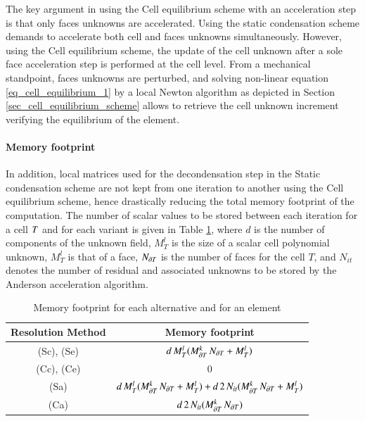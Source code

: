 The key argument in using the
Cell equilibrium scheme with an acceleration step is that 
only faces unknowns are accelerated.
Using the static condensation scheme demands to accelerate both cell and faces unknowns simultaneously.
However, using the Cell equilibrium scheme, the update of the cell unknown after a sole face acceleration step is performed at the cell level.
From a mechanical standpoint, faces unknowns are perturbed, and solving non-linear equation \eqref{eq_cell_equilibrium_1} by a local Newton algorithm as depicted in Section \ref{sec_cell_equilibrium_scheme} allows to retrieve the cell unknown increment verifying the equilibrium of the element.

\paragraph{Memory footprint}

In addition, local matrices used for the decondensation step in the Static condensation scheme are not kept from one iteration
to another using the Cell equilibrium scheme, hence drastically reducing the total memory footprint of the computation.
The number of scalar values to be stored between each iteration for a cell $T$ and for each variant is given in Table \ref{table_memory_footprint}, where $d$ is the number of components of the unknown field,
$M^l_T$ is the size of a scalar cell polynomial unknown, $M^l_T$ is that of a face, $N_{\partial T}$ is the number of faces for the cell $T$, and
$N_{it}$ denotes the number of residual and associated unknowns to be stored by the Anderson acceleration algorithm.

\begin{table}[H]
    \centering
    \begin{tabular}{||c c||} 
        \hline
        Resolution Method & Memory footprint
        \\
        [0.5ex] 
        \hline\hline
        (Sc), (Se) & $d \, M^l_T (M^k_{\partial T} \, N_{\partial T} + M^l_T)$
        \\ \hline
        (Cc), (Ce) & 0
        \\ \hline
        (Sa) & $d \, M^l_T (M^k_{\partial T} \, N_{\partial T} + M^l_T) + d \, 2 \, N_{it} (M^k_{\partial T} \, N_{\partial T} + M^l_T) $
        \\ \hline
        (Ca) & $d \, 2 \, N_{it} (M^k_{\partial T} \, N_{\partial T})$
        \\ \hline
    \end{tabular}
    \caption{Memory footprint for each alternative and for an element}
    \label{table_memory_footprint}
\end{table}

